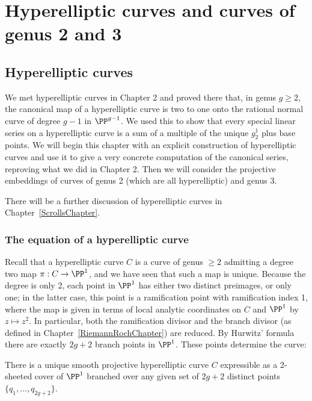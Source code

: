 

\chapter{Hyperelliptic curves and curves of genus 2 and 3}\label{genus 2 and 3 chapter}

\section{Hyperelliptic curves}\label{hyperelliptic}
 
We met hyperelliptic curves in Chapter 2 and proved there that, in genus $g \geq 2$, the canonical
map of a hyperelliptic curve is two to one onto the rational normal curve of degree $g-1$ in $\PP^{g-1}$. We used this to show that every special linear series on a hyperelliptic curve is a sum of a multiple of  the 
unique $g^1_2$ plus base points. We will begin this chapter with an explicit construction of hyperelliptic curves and use it to give a very concrete computation of the canonical series, reproving what we did in Chapter 2. Then we will consider the projective embeddings of curves of genus 2 (which are all hyperelliptic) and genus 3.
 
There will be a further discussion of hyperelliptic curves in Chapter~\ref{ScrollsChapter}.
  
 \subsection{The equation of a hyperelliptic curve}
 
Recall that a hyperelliptic curve $C$ is a curve of genus $\geq 2$ admitting a degree two map $\pi : C \to \PP^1$, and we have seen that such a map is unique. Because the degree is only 2, each point in $\PP^1$ has either two distinct preimages, or only one; in the latter case, this point is a ramification point with ramification index 1, where the map is given in terms of local analytic coordinates on $C$ and $\PP^1$ by $z \mapsto z^2$. In particular, both the ramification divisor and the branch divisor (as defined in Chapter~\ref{RiemannRochChapter}) are reduced. By  Hurwitz' formula there are exactly $2g+2$ branch points in $\PP^1$. These points determine the curve:
 
\begin{theorem}\label{hyperelliptic existence}
There is a unique smooth projective hyperelliptic curve $C$ expressible as a 2-sheeted cover of $\PP^1$ branched over any given set of $2g+2$ distinct points $\{q_{1}, \dots, q_{2g+2}\}$.
\end{theorem}

